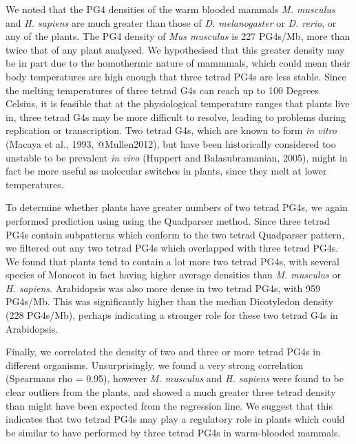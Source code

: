\documentclass[12pt,a4paper,]{report}
\begin{document}
We noted that the PG4 densities of the warm blooded mammals \emph{M.
musculus} and \emph{H. sapiens} are much greater than those of \emph{D.
melanogaster} or \emph{D. rerio}, or any of the plants. The PG4 density
of \emph{Mus musculus} is 227 PG4s/Mb, more than twice that of any plant
analysed. We hypothesised that this greater density may be in part due
to the homothermic nature of mammmals, which could mean their body
temperatures are high enough that three tetrad PG4s are less stable.
Since the melting temperatures of three tetrad G4s can reach up to 100
Degrees Celsius, it is feasible that at the physiological temperature
ranges that plants live in, three tetrad G4s may be more difficult to
resolve, leading to problems during replication or transcription. Two
tetrad G4s, which are known to form \emph{in vitro} (Macaya et al.,
1993, @Mullen2012), but have been historically considered too unstable
to be prevalent \emph{in vivo} (Huppert and Balasubramanian, 2005),
might in fact be more useful as molecular switches in plants, since they
melt at lower temperatures.

To determine whether plants have greater numbers of two tetrad PG4s, we
again performed prediction using using the Quadparser method. Since
three tetrad PG4s contain subpatterns which conform to the two tetrad
Quadparser pattern, we filtered out any two tetrad PG4s which overlapped
with three tetrad PG4s. We found that plants tend to contain a lot more
two tetrad PG4s, with several species of Monocot in fact having higher
average densities than \emph{M. musculus} or \emph{H. sapiens}.
Arabidopsis was also more dense in two tetrad PG4s, with 959 PG4s/Mb.
This was significantly higher than the median Dicotyledon density (228
PG4s/Mb), perhaps indicating a stronger role for these two tetrad G4s in
Arabidopsis.

Finally, we correlated the density of two and three or more tetrad PG4s
in different organisms. Unsurprisingly, we found a very strong
correlation (Spearmans rho = 0.95), however \emph{M. musculus} and
\emph{H. sapiens} were found to be clear outliers from the plants, and
showed a much greater three tetrad density than might have been expected
from the regression line. We suggest that this indicates that two tetrad
PG4s may play a regulatory role in plants which could be similar to have
performed by three tetrad PG4s in warm-blooded mammals.

\newpage
\end{document}
